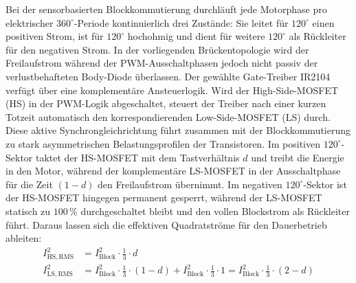 Bei der sensorbasierten Blockkommutierung durchläuft jede Motorphase pro elektrischer $360^\circ$-Periode kontinuierlich drei Zustände: Sie leitet für $120^\circ$ einen positiven Strom, ist für $120^\circ$ hochohmig und dient für weitere $120^\circ$ als Rückleiter für den negativen Strom. In der vorliegenden Brückentopologie wird der Freilaufstrom während der PWM-Ausschaltphasen jedoch nicht passiv der verlustbehafteten Body-Diode überlassen. Der gewählte Gate-Treiber IR2104 verfügt über eine komplementäre Ansteuerlogik. Wird der High-Side-MOSFET (HS) in der PWM-Logik abgeschaltet, steuert der Treiber nach einer kurzen Totzeit automatisch den korrespondierenden Low-Side-MOSFET (LS) durch. Diese aktive Synchrongleichrichtung führt zusammen mit der Blockkommutierung zu stark asymmetrischen Belastungsprofilen der Transistoren.
Im positiven $120^\circ$-Sektor taktet der HS-MOSFET mit dem Tastverhältnis $d$ und treibt die Energie in den Motor, während der komplementäre LS-MOSFET in der Ausschaltphase für die Zeit $(1-d)$ den Freilaufstrom übernimmt. Im negativen $120^\circ$-Sektor ist der HS-MOSFET hingegen permanent gesperrt, während der LS-MOSFET statisch zu $100\,\%$ durchgeschaltet bleibt und den vollen Blockstrom als Rückleiter führt. 
Daraus lassen sich die effektiven Quadratströme für den Dauerbetrieb ableiten:
\begin{align}
    I_{\mathrm{HS,RMS}}^2 &= I_{\mathrm{Block}}^2 \cdot \frac{1}{3} \cdot d \label{eq:i_hs_rms} \\
    I_{\mathrm{LS,RMS}}^2 &= I_{\mathrm{Block}}^2 \cdot \frac{1}{3} \cdot (1 - d) + I_{\mathrm{Block}}^2 \cdot \frac{1}{3} \cdot 1 = I_{\mathrm{Block}}^2 \cdot \frac{1}{3} \cdot (2 - d) \label{eq:i_ls_rms}
\end{align}

